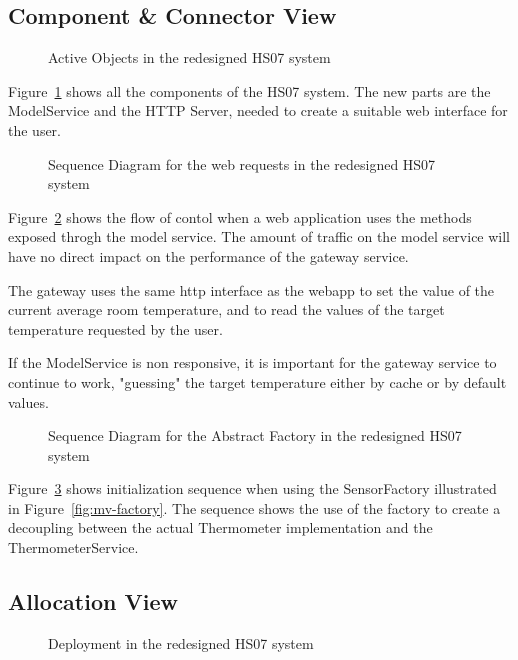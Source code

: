 \documentclass[a4paper,10pt]{article}
\begin{document}
\subsection{Component \& Connector View}

\begin{figure}[!htb]
\centerline{}
\caption{Active Objects in the redesigned HS07 system}
\label{fig:activeobjects}
\end{figure}
Figure~\ref{fig:activeobjects} shows all the components of the HS07 system. The new parts are the ModelService and the HTTP Server, needed to create a suitable web interface for the user.
\clearpage


\begin{figure}[!htb]
\centerline{}
\caption{Sequence Diagram for the web requests in the redesigned HS07 system}
\label{fig:seq-stt}
\end{figure}
Figure~\ref{fig:seq-stt} shows the flow of contol when a web application uses the methods exposed throgh the model service. The amount of traffic on the model service will have no direct impact on the performance of the gateway service.

The gateway uses the same http interface as the webapp to set the value of the current average room temperature, and to read the values of the target temperature requested by the user.

If the ModelService is non responsive, it is important for the gateway service to continue to work, "guessing" the target temperature either by cache or by default values.

\begin{figure}[!htb]
\centerline{}
\caption{Sequence Diagram for the Abstract Factory in the redesigned HS07 system}
\label{fig:seq-tfac}
\end{figure}
Figure~\ref{fig:seq-tfac} shows initialization sequence when using the SensorFactory illustrated in Figure~\ref{fig:mv-factory}. The sequence shows the use of the factory to create a decoupling between the actual Thermometer implementation and the ThermometerService.
\clearpage

\subsection{Allocation View}

\begin{figure}[!htb]
\centerline{}
\caption{Deployment in the redesigned HS07 system}
\label{fig:deployment}
\end{figure}

\clearpage




\end{document}
